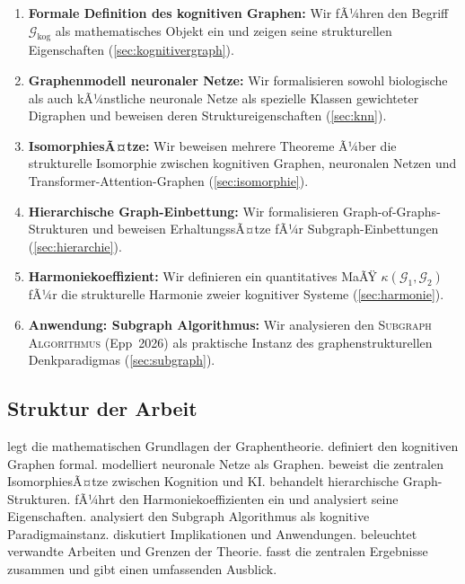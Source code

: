﻿\documentclass[12pt,a4paper]{article}
\theoremstyle{plain}
\theoremstyle{definition}
\theoremstyle{remark}
\newcommand{\GG}{\mathcal{G}}
\newcommand{\SA}{\textnormal{\textsc{Subgraph Algorithmus}}}
\begin{document}
\begin{enumerate}[label=\textbf{(B\arabic*)}]
  \item \textbf{Formale Definition des kognitiven Graphen:} Wir fÃ¼hren den Begriff $\GG_{\text{kog}}$ als mathematisches Objekt ein und zeigen seine strukturellen Eigenschaften (\cref{sec:kognitivergraph}).

  \item \textbf{Graphenmodell neuronaler Netze:} Wir formalisieren sowohl biologische als auch kÃ¼nstliche neuronale Netze als spezielle Klassen gewichteter Digraphen und beweisen deren Struktureigenschaften (\cref{sec:knn}).

  \item \textbf{IsomorphiesÃ¤tze:} Wir beweisen mehrere Theoreme Ã¼ber die strukturelle Isomorphie zwischen kognitiven Graphen, neuronalen Netzen und Transformer-Attention-Graphen (\cref{sec:isomorphie}).

  \item \textbf{Hierarchische Graph-Einbettung:} Wir formalisieren Graph-of-Graphs-Struk\-turen und beweisen ErhaltungssÃ¤tze fÃ¼r Subgraph-Einbettungen (\cref{sec:hierarchie}).

  \item \textbf{Harmoniekoeffizient:} Wir definieren ein quantitatives MaÃŸ $\kappa(\GG_1, \GG_2)$ fÃ¼r die strukturelle Harmonie zweier kognitiver Systeme (\cref{sec:harmonie}).

  \item \textbf{Anwendung: Subgraph Algorithmus:} Wir analysieren den \SA{} (Epp~2026) als praktische Instanz des graphenstrukturellen Denkparadigmas (\cref{sec:subgraph}).
\end{enumerate}

\subsection{Struktur der Arbeit}

 legt die mathematischen Grundlagen der Graphentheorie.  definiert den kognitiven Graphen formal.  modelliert neuronale Netze als Graphen.  beweist die zentralen IsomorphiesÃ¤tze zwischen Kognition und KI.  behandelt hierarchische Graph-Strukturen.  fÃ¼hrt den Harmoniekoeffizienten ein und analysiert seine Eigenschaften.  analysiert den Subgraph Algorithmus als kognitive Paradigmainstanz.  diskutiert Implikationen und Anwendungen.  beleuchtet verwandte Arbeiten und Grenzen der Theorie.  fasst die zentralen Ergebnisse zusammen und gibt einen umfassenden Ausblick.
\end{document}

